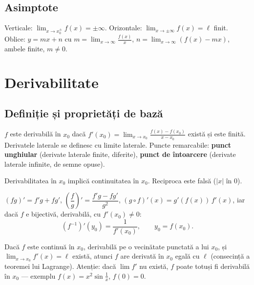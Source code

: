 \subsection{Asimptote}
Verticale: $\lim_{x\to x_0^{\pm}} f(x)=\pm\infty$. Orizontale: $\lim_{x\to\pm\infty}f(x)=\ell$ finit. Oblice: $y=mx+n$ cu
$m=\lim_{x\to\infty}\frac{f(x)}{x}$, $n=\lim_{x\to\infty}(f(x)-mx)$, ambele finite, $m \neq 0$.

\section{Derivabilitate}

\subsection{Definiție și proprietăți de bază}

\begin{definitie}
$f$ este derivabilă în $x_0$ dacă $\displaystyle f'(x_0)=\lim_{x\to x_0}\frac{f(x)-f(x_0)}{x-x_0}$ există și este finită. Derivatele laterale se definesc cu limite laterale. Puncte remarcabile: \textbf{punct unghiular} (derivate laterale finite, diferite), \textbf{punct de întoarcere} (derivate laterale infinite, de semne opuse).
\end{definitie}

\begin{teorema}
Derivabilitatea în $x_0$ implică continuitatea în $x_0$. Reciproca este falsă ($|x|$ în $0$).
\end{teorema}

\begin{propozitie}
$(fg)'=f'g+fg'$, $\left(\dfrac{f}{g}\right)'=\dfrac{f'g-fg'}{g^2}$, $(g\circ f)'(x)=g'(f(x))\, f'(x)$, iar dacă $f$ e bijectivă, derivabilă, cu $f'(x_0)\ne 0$:
\[
\left(f^{-1}\right)'(y_0)=\frac{1}{f'(x_0)},\qquad y_0=f(x_0).
\]
\end{propozitie}

\begin{obs}
Dacă $f$ este continuă în $x_0$, derivabilă pe o vecinătate punctată a lui $x_0$, și $\lim_{x\to x_0}f'(x)=\ell$ există, atunci $f$ are derivată în $x_0$ egală cu $\ell$ (consecință a teoremei lui Lagrange). Atenție: dacă $\lim f'$ nu există, $f$ poate totuși fi derivabilă în $x_0$ --- exemplu $f(x)=x^2\sin\frac1x$, $f(0)=0$.
\end{obs}

